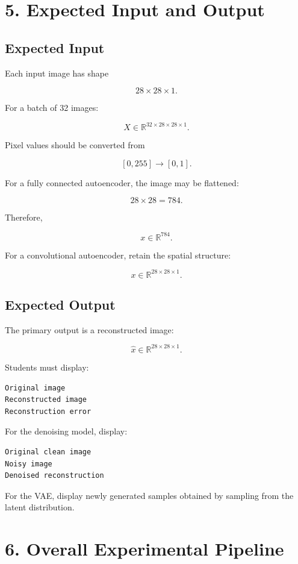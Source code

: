 \documentclass[10pt]{article}
\begin{document}
\section*{5. Expected Input and Output}

\subsection*{Expected Input}

Each input image has shape

\[
28\times28\times1.
\]

For a batch of 32 images:

\[
X\in\mathbb{R}^{32\times28\times28\times1}.
\]

Pixel values should be converted from

\[
[0,255]\rightarrow[0,1].
\]

For a fully connected autoencoder, the image may be flattened:

\[
28\times28=784.
\]

Therefore,

\[
x\in\mathbb{R}^{784}.
\]

For a convolutional autoencoder, retain the spatial structure:

\[
x\in\mathbb{R}^{28\times28\times1}.
\]

\subsection*{Expected Output}

The primary output is a reconstructed image:

\[
\hat{x}\in\mathbb{R}^{28\times28\times1}.
\]

Students must display:

\begin{verbatim}
Original image
Reconstructed image
Reconstruction error
\end{verbatim}

For the denoising model, display:

\begin{verbatim}
Original clean image
Noisy image
Denoised reconstruction
\end{verbatim}

For the VAE, display newly generated samples obtained by sampling from the
latent distribution.

\section*{6. Overall Experimental Pipeline}
\end{document}
